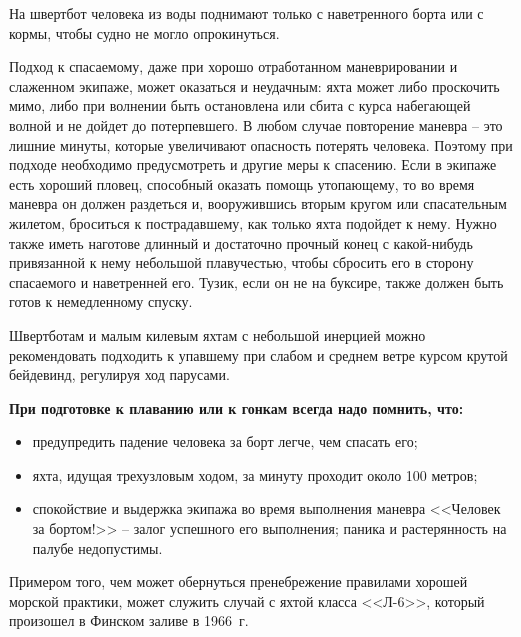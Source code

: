 \documentclass[a4paper, 12pt, twoside, final]{scrbook}
\begin{document}
На швертбот человека из воды поднимают только с наветренного борта или с кормы, чтобы судно не могло опрокинуться.

Подход к спасаемому, даже при хорошо отработанном маневрировании и слаженном экипаже, может оказаться и неудачным: яхта может либо проскочить мимо, либо при волнении быть остановлена или сбита с курса набегающей волной и не дойдет до потерпевшего. В любом случае повторение маневра \--- это лишние минуты, которые увеличивают опасность потерять человека. Поэтому при подходе необходимо предусмотреть и другие меры к спасению. Если в экипаже есть хороший пловец, способный оказать помощь утопающему, то во время маневра он должен раздеться и, вооружившись вторым кругом или спасательным жилетом, броситься к пострадавшему, как только яхта подойдет к нему. Нужно также иметь наготове длинный и достаточно прочный конец с какой-нибудь привязанной к нему небольшой плавучестью, чтобы сбросить его в сторону спасаемого и наветренней его. Тузик, если он не на буксире, также должен быть готов к немедленному спуску.

Швертботам и малым килевым яхтам с небольшой инерцией можно рекомендовать подходить к упавшему при слабом и среднем ветре курсом крутой бейдевинд, регулируя ход парусами.

\textbf{При подготовке к плаванию или к гонкам всегда надо помнить, что:}

\begin{itemize}
\item предупредить падение человека за борт легче, чем спасать его;
\item яхта, идущая трехузловым ходом, за минуту проходит около 100 метров;
\item спокойствие и выдержка экипажа во время выполнения маневра <<Человек за бортом!>> \--- залог успешного его выполнения; паника и растерянность на палубе недопустимы.
\end{itemize}

Примером того, чем может обернуться пренебрежение правилами хорошей морской практики, может служить случай с яхтой класса <<Л-6>>, который произошел в Финском заливе в 1966~г.
\end{document}
